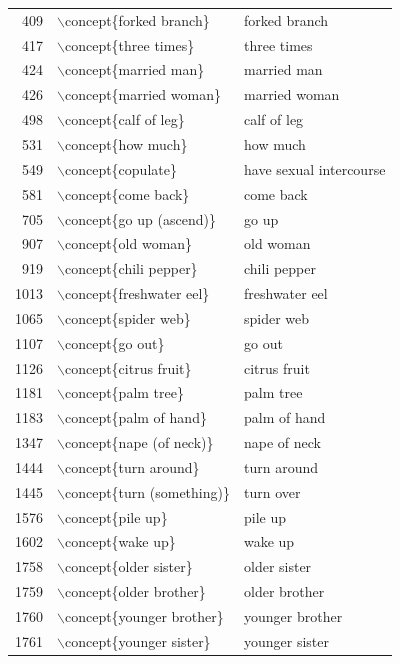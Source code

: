 \begin{table}[ht]
\begin{tabular}{rll}
  409 & $\backslash$concept\{forked branch\} & forked branch \\ 
  417 & $\backslash$concept\{three times\} & three times \\ 
  424 & $\backslash$concept\{married man\} & married man \\ 
  426 & $\backslash$concept\{married woman\} & married woman \\ 
  498 & $\backslash$concept\{calf of leg\} & calf of leg \\ 
  531 & $\backslash$concept\{how much\} & how much \\ 
  549 & $\backslash$concept\{copulate\} & have sexual intercourse \\ 
  581 & $\backslash$concept\{come back\} & come back \\ 
  705 & $\backslash$concept\{go up (ascend)\} & go up \\ 
  907 & $\backslash$concept\{old woman\} & old woman \\ 
  919 & $\backslash$concept\{chili pepper\} & chili pepper \\ 
  1013 & $\backslash$concept\{freshwater eel\} & freshwater eel \\ 
  1065 & $\backslash$concept\{spider web\} & spider web \\ 
  1107 & $\backslash$concept\{go out\} & go out \\ 
  1126 & $\backslash$concept\{citrus fruit\} & citrus fruit \\ 
  1181 & $\backslash$concept\{palm tree\} & palm tree \\ 
  1183 & $\backslash$concept\{palm of hand\} & palm of hand \\ 
  1347 & $\backslash$concept\{nape (of neck)\} & nape of neck \\ 
  1444 & $\backslash$concept\{turn around\} & turn around \\ 
  1445 & $\backslash$concept\{turn (something)\} & turn over \\ 
  1576 & $\backslash$concept\{pile up\} & pile up \\ 
  1602 & $\backslash$concept\{wake up\} & wake up \\ 
  1758 & $\backslash$concept\{older sister\} & older sister \\ 
  1759 & $\backslash$concept\{older brother\} & older brother \\ 
  1760 & $\backslash$concept\{younger brother\} & younger brother \\ 
  1761 & $\backslash$concept\{younger sister\} & younger sister \\ 

\end{tabular}
\end{table}

